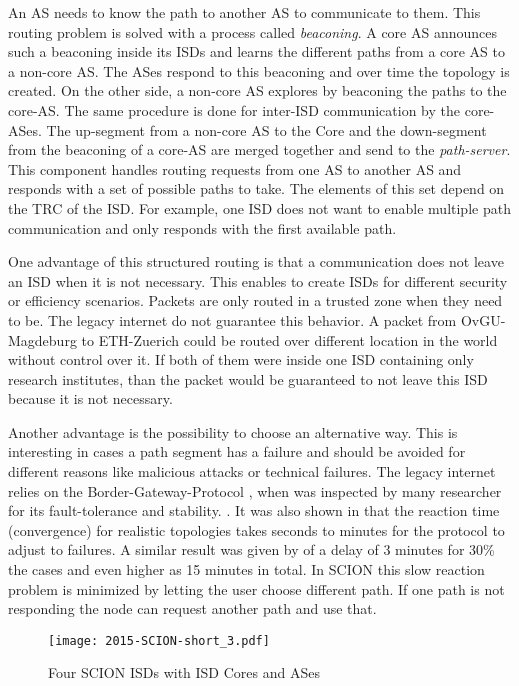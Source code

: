 \documentclass[thesis.tex]{subfiles}
\begin{document}
An AS needs to know the path to another AS to communicate to them. This routing problem is solved with a process called \textit{beaconing}. A core AS announces such a beaconing inside its ISDs and learns the different paths from a core AS to a non-core AS. The ASes respond to this beaconing and over time the topology is created. On the other side, a non-core AS explores by beaconing the paths to the core-AS. The same procedure is done for inter-ISD communication by the core-ASes. The up-segment from a non-core AS to the Core and the down-segment from the beaconing of a core-AS are merged together and send to the \textit{path-server}. This component handles routing requests from one AS to another AS and responds with a set of possible paths to take. The elements of this set depend on the TRC of the ISD. For example, one ISD does not want to enable multiple path communication and only responds with the first available path.

One advantage of this structured routing is that a communication does not leave an ISD when it is not necessary. This enables to create ISDs for different security or efficiency scenarios. Packets are only routed in a trusted zone when they need to be. The legacy internet do not guarantee this behavior. A packet from OvGU-Magdeburg to ETH-Zuerich could be routed over different location in the world without control over it. If both of them were inside one ISD containing only research institutes, than the packet would be guaranteed to not leave this ISD because it is not necessary.

Another advantage is the possibility to choose an alternative way. This is interesting in cases a path segment has a failure and should be avoided for different reasons like malicious attacks or technical failures. The legacy internet relies on the Border-Gateway-Protocol , when was inspected by many researcher for its fault-tolerance and stability. . It was also shown in \cite{Sahoo.2006} that the reaction time (convergence) for realistic topologies takes seconds to minutes for the protocol to adjust to failures. A similar result was given by \cite{Labovitz.2001} of a delay of 3 minutes for 30\% the cases and even higher as 15 minutes in total. In SCION this slow reaction problem is minimized by letting the user choose different path. If one path is not responding the node can request another path and use that. 

\begin{figure}
	\centering
	\texttt{[image: 2015-SCION-short\_3.pdf]}
	\caption{Four SCION ISDs with ISD Cores and ASes \cite{SCIONPaper}}
	\label{fig:prequirement:scionStructure}
\end{figure}
\end{document}
